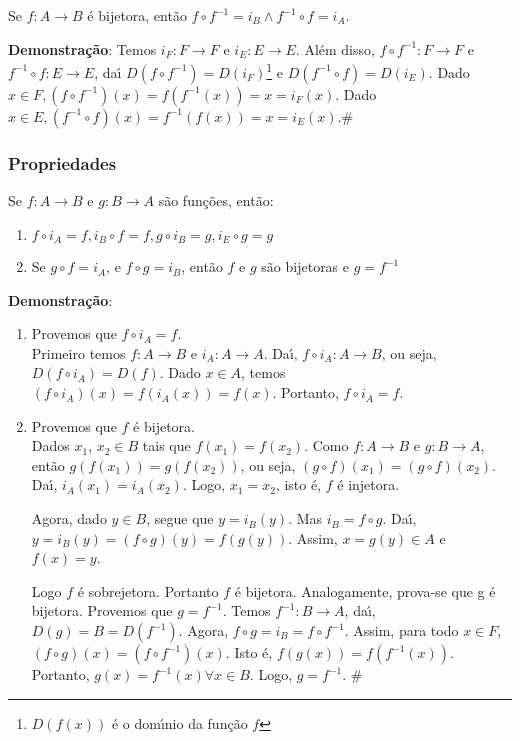 \begin{proposicao}
Se $f:A\rightarrow B$ {\'e} bijetora, ent{\~a}o $f\circ f^{-1}=i_{B}\wedge f^{-1}\circ f=i_{A}$.
\end{proposicao}

\textbf{Demonstra{\c c}{\~a}o}: Temos $i_{F}:F\rightarrow F$ e $i_{E}:E\rightarrow E$. Al{\'e}m disso, $f\circ f^{-1}:F\rightarrow F$ e $f^{-1}\circ f:E\rightarrow E$, da{\'\i} $D(f\circ f^{-1})=D(i_{F})$\footnote{$D(f(x))$ {\'e} o dom{\'\i}nio da fun{\c c}{\~a}o $f$} e $D(f^{-1}\circ f)=D(i_{E})$. Dado $x\in F, (f\circ f^{-1})(x)=f(f^{-1}(x))=x=i_{F}(x)$. Dado $x\in E, (f^{-1}\circ f)(x)=f^{-1}(f(x))=x=i_{E}(x)$.\#

\subsubsection{Propriedades}
\begin{proposicao} Se $f:A\rightarrow B$ e $g:B\rightarrow A$ s{\~a}o fun{\c c}{\~o}es, ent{\~a}o:
\begin{enumerate}
\item $f\circ i_{A}=f, i_{B}\circ f=f, g\circ i_{B}=g, i_{E}\circ g=g$
\item Se $g\circ f=i_{A}$, e $f\circ g=i_{B}$, ent{\~a}o $f$ e $g$ s{\~a}o bijetoras e $g=f^{-1}$
\end{enumerate}
\end{proposicao}

\textbf{Demonstra{\c c}{\~a}o}:
\begin{enumerate}
\item Provemos que $f\circ i_{A}=f$.\\
Primeiro temos $f:A\rightarrow B$ e $i_{A}:A\rightarrow A$. Da{\'\i}, $f\circ i_{A}:A\rightarrow B$, ou seja, $D(f\circ i_{A})=D(f)$. Dado $x\in A$, temos $(f\circ i_{A})(x)=f(i_{A}(x))=f(x)$. Portanto, $f\circ i_{A}=f$.
\item Provemos que $f$ {\'e} bijetora.\\
Dados $x_{1}$, $x_{2}\in B$ tais que $f(x_{1})=f(x_{2})$. Como $f:A\rightarrow B$ e $g:B\rightarrow A$, ent{\~a}o $g(f(x_{1}))=g(f(x_{2}))$, ou seja, $(g\circ f)(x_{1})=(g\circ f)(x_{2})$. Da{\'\i}, $i_{A}(x_{1})=i_{A}(x_{2})$. Logo, $x_{1}=x_{2}$, isto {\'e}, $f$ {\'e} injetora.

Agora, dado $y\in B$, segue que $y=i_{B}(y)$. Mas $i_{B}=f\circ g$. Da{\'\i}, $y=i_{B}(y)=(f\circ g)(y)=f(g(y))$. Assim, $x=g(y)\in A$ e $f(x)=y$.

Logo $f$ {\'e} sobrejetora. Portanto $f$ {\'e} bijetora. Analogamente, prova-se que g {\'e} bijetora. Provemos que $g=f^{-1}$. Temos  $f^{-1}:B\rightarrow A$, da{\'\i}, $D(g) = B = D(f^{-1})$. Agora, $f\circ g = i_{B} = f\circ f^{-1}$. Assim, para todo $x\in F$, $(f\circ g)(x)=(f\circ f^{-1})(x)$. Isto {\'e}, $f(g(x))=f(f^{-1}(x))$. Portanto, $g(x)=f^{-1}(x)\forall x\in B$. Logo, $g=f^{-1}$. \#
\end{enumerate}

